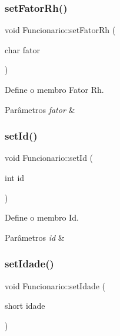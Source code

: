 \subsubsection{\texorpdfstring{set\+Fator\+Rh()}{setFatorRh()}}
{\footnotesize\ttfamily void Funcionario\+::set\+Fator\+Rh (\begin{DoxyParamCaption}\item[{char}]{fator }\end{DoxyParamCaption})}



Define o membro Fator Rh. 


\begin{DoxyParams}{Parâmetros}
{\em fator} & \\
\hline
\end{DoxyParams}
\mbox{\label{classFuncionario_acc0b430d08b2c459682d7bb01c0ab1c4}} 
\subsubsection{\texorpdfstring{set\+Id()}{setId()}}
{\footnotesize\ttfamily void Funcionario\+::set\+Id (\begin{DoxyParamCaption}\item[{int}]{id }\end{DoxyParamCaption})}



Define o membro Id. 


\begin{DoxyParams}{Parâmetros}
{\em id} & \\
\hline
\end{DoxyParams}
\mbox{\label{classFuncionario_af85eeb2e2b606d60da800c7084f23769}} 
\subsubsection{\texorpdfstring{set\+Idade()}{setIdade()}}
{\footnotesize\ttfamily void Funcionario\+::set\+Idade (\begin{DoxyParamCaption}\item[{short}]{idade }\end{DoxyParamCaption})}



